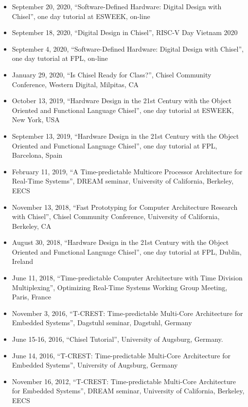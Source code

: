\documentclass[%
    a4paper,
    11pt, %
    headinclude, footexclude,
    notitlepage,
    headsepline,
    pointlessnumbers,
    ]{scrartcl}
\begin{document}
\begin{itemize}
\item  September 20, 2020, ``Software-Defined Hardware: Digital Design with Chisel'', one day tutorial at ESWEEK, on-line
\item September 18, 2020, ``Digital Design in Chisel'', RISC-V Day Vietnam 2020
\item  September 4, 2020, ``Software-Defined Hardware: Digital Design with Chisel'', one day tutorial at FPL, on-line
\item January 29, 2020, ``Is Chisel Ready for Class?'',
Chisel Community Conference, Western Digital, Milpitas, CA
\item October 13, 2019, ``Hardware Design in the 21st Century with the Object Oriented and Functional Language Chisel'', one day tutorial at ESWEEK, New York, USA
\item September 13, 2019, ``Hardware Design in the 21st Century with the Object Oriented and Functional Language Chisel'', one day tutorial at FPL, Barcelona, Spain
\item February 11, 2019, ``A Time-predictable Multicore Processor Architecture for Real-Time Systems'', DREAM seminar, University of California, Berkeley, EECS
\item November 13, 2018, ``Fast Prototyping for Computer Architecture Research with Chisel'',
Chisel Community Conference, University of California, Berkeley, CA
\item August 30, 2018, ``Hardware Design in the 21st Century with the Object Oriented and Functional Language Chisel'', one day tutorial at FPL, Dublin, Ireland
\item June 11, 2018, ``Time-predictable Computer Architecture with Time Division Multiplexing'',
Optimizing Real-Time Systems Working Group Meeting, Paris, France
 \item November 3, 2016, ``T-CREST: Time-predictable Multi-Core Architecture for Embedded Systems'',
      Dagstuhl seminar, Dagstuhl, Germany
\item June 15-16, 2016, ``Chisel Tutorial'', University of Augsburg, Germany.
\item June 14, 2016, ``T-CREST: Time-predictable Multi-Core Architecture for Embedded Systems'',
University of Augsburg, Germany
 \item November 16, 2012, ``T-CREST: Time-predictable Multi-Core Architecture for Embedded Systems'',
      DREAM seminar, University of California, Berkeley, EECS

\end{itemize}
\end{document}
